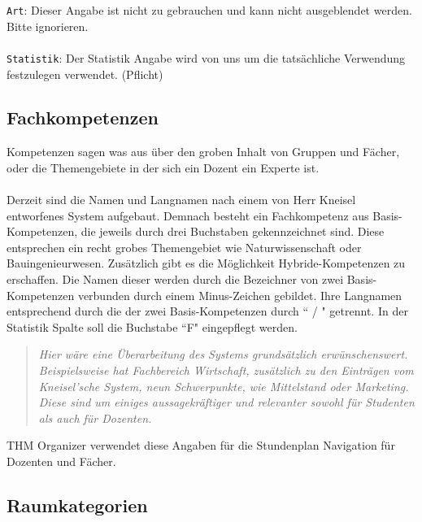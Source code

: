 \noindent
\texttt{Art}: Dieser Angabe ist nicht zu gebrauchen und kann nicht ausgeblendet werden. Bitte ignorieren.\\
\\
\texttt{Statistik}: Der Statistik Angabe wird von uns um die tatsächliche Verwendung festzulegen verwendet. (Pflicht)\\

\subsection{Fachkompetenzen}
\label{subsec:fachkompetenzen}

Kompetenzen sagen was aus über den groben Inhalt von Gruppen und Fächer, oder die Themengebiete in der sich ein Dozent ein Experte ist.\\
\\
Derzeit sind die Namen und Langnamen nach einem von Herr Kneisel entworfenes System aufgebaut. Demnach besteht ein Fachkompetenz aus Basis-Kompetenzen, die jeweils durch drei Buchstaben gekennzeichnet sind. Diese entsprechen ein recht grobes Themengebiet wie Naturwissenschaft oder Bauingenieurwesen. Zusätzlich gibt es die Möglichkeit Hybride-Kompetenzen zu erschaffen. Die Namen dieser werden durch die Bezeichner von zwei Basis-Kompetenzen verbunden durch einem Minus-Zeichen gebildet. Ihre Langnamen entsprechend durch die der zwei Basis-Kompetenzen durch `` / " getrennt. In der Statistik Spalte soll die Buchstabe ``F" eingepflegt werden.\\

\newpage

\begin{quote}
	\textit{Hier wäre eine Überarbeitung des Systems grundsätzlich erwünschenswert. Beispielsweise hat Fachbereich Wirtschaft, zusätzlich zu den Einträgen vom Kneisel'sche System, neun Schwerpunkte, wie Mittelstand oder Marketing. Diese sind um einiges aussagekräftiger und relevanter sowohl für Studenten als auch für Dozenten.}
\end{quote}

\noindent
THM Organizer verwendet diese Angaben für die Stundenplan Navigation für Dozenten und Fächer.\\

\subsection{Raumkategorien}
\label{subsec:room-category}


